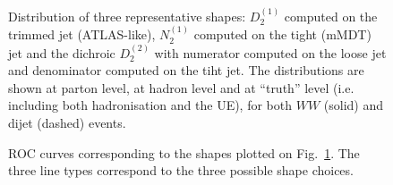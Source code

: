 \documentclass[11pt,letterpaper]{article}
\begin{document}
\begin{figure}
  \caption{Distribution of three representative shapes: $D_2^{(1)}$
    computed on the trimmed jet (ATLAS-like), $N_2^{(1)}$ computed on
    the tight (mMDT) jet and the dichroic $D_2^{(2)}$ with numerator
    computed on the loose jet and denominator computed on the tiht
    jet. The distributions are shown at parton level, at hadron level
    and at ``truth'' level (i.e. including both hadronisation and the
    UE), for both $WW$ (solid) and dijet (dashed)
    events.}\label{fig:shape-distribution}
\end{figure}

\begin{figure}
  \caption{ROC curves corresponding to the shapes plotted on
    Fig.~\ref{fig:shape-distribution}. The three line types correspond
    to the three possible shape choices.}\label{fig:rocs}
\end{figure}
\end{document}
